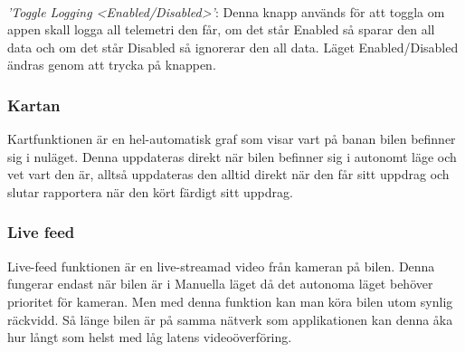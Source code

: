 \documentclass[10pt,oneside,swedish]{lips}
\begin{document}
\noindent \\
\emph{'Toggle Logging <Enabled/Disabled>'}: Denna knapp används för att toggla om appen skall logga all telemetri den får, om det står Enabled så sparar den all data och om det står Disabled så ignorerar den all data. Läget Enabled/Disabled ändras genom att trycka på knappen.

\subsubsection{Kartan}
Kartfunktionen är en hel-automatisk graf som visar vart på banan bilen befinner sig i nuläget. Denna uppdateras direkt när bilen befinner sig i autonomt läge och vet vart den är, alltså uppdateras den alltid direkt när den får sitt uppdrag och slutar rapportera när den kört färdigt sitt uppdrag.

\subsubsection{Live feed}
Live-feed funktionen är en live-streamad video från kameran på bilen. Denna fungerar endast när bilen är i Manuella läget då det autonoma läget behöver prioritet för kameran. Men med denna funktion kan man köra bilen utom synlig räckvidd. Så länge bilen är på samma nätverk som applikationen kan denna åka hur långt som helst med låg latens videoöverföring.

\cleardoublepage

\appendix{}
\end{document}
